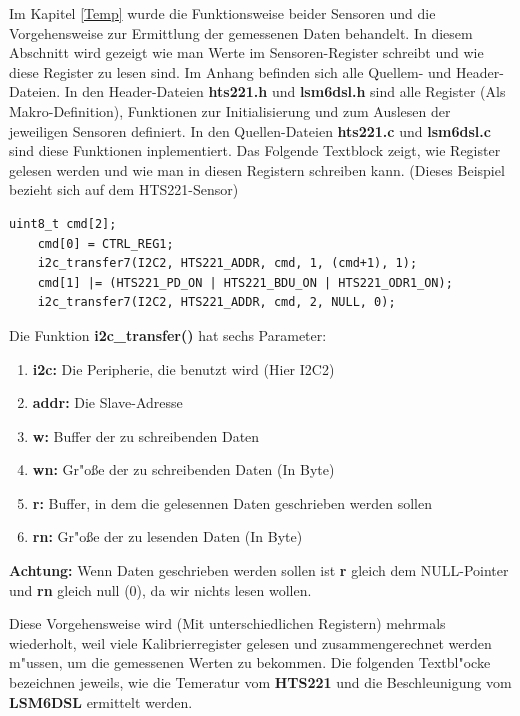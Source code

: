 \vspace{2cm}
Im Kapitel \ref{Temp} wurde die Funktionsweise beider Sensoren und die 
Vorgehensweise zur Ermittlung der gemessenen Daten behandelt. In diesem 
Abschnitt wird gezeigt wie man Werte im Sensoren-Register schreibt und
wie diese Register zu lesen sind. Im Anhang befinden sich alle Quellem- 
und Header-Dateien. In den Header-Dateien \textbf{hts221.h} und 
\textbf{lsm6dsl.h} sind alle Register (Als Makro-Definition), 
Funktionen zur Initialisierung und zum Auslesen der jeweiligen Sensoren 
definiert. In den Quellen-Dateien \textbf{hts221.c} und 
\textbf{lsm6dsl.c} sind diese Funktionen inplementiert. Das Folgende 
Textblock zeigt, wie Register gelesen werden und wie man in diesen 
Registern schreiben kann. (Dieses Beispiel bezieht sich auf dem 
HTS221-Sensor)

\begin{lstlisting}[frame=single]
	uint8_t cmd[2];
	cmd[0] = CTRL_REG1;
	i2c_transfer7(I2C2, HTS221_ADDR, cmd, 1, (cmd+1), 1);
	cmd[1] |= (HTS221_PD_ON | HTS221_BDU_ON | HTS221_ODR1_ON);
	i2c_transfer7(I2C2, HTS221_ADDR, cmd, 2, NULL, 0);

\end{lstlisting}
Die Funktion \textbf{i2c\_transfer()} hat sechs Parameter:

\begin{enumerate}
	\item \textbf{i2c:} Die Peripherie, die benutzt wird (Hier I2C2) 
	\item \textbf{addr:} Die Slave-Adresse  
	\item \textbf{w:} Buffer der zu schreibenden Daten
	\item \textbf{wn:} Gr"o\ss{}e der zu schreibenden Daten (In Byte)
	\item \textbf{r:} Buffer, in dem die gelesennen Daten geschrieben 
	werden sollen
	\item \textbf{rn:} Gr"o\ss{}e der zu lesenden Daten (In Byte)
\end{enumerate}

\textbf{Achtung:} Wenn Daten geschrieben werden sollen ist \textbf{r} 
gleich dem NULL-Pointer und \textbf{rn} gleich null (0), da wir nichts 
lesen wollen.

Diese Vorgehensweise wird (Mit unterschiedlichen Registern) mehrmals wiederholt, weil viele Kalibrierregister gelesen und zusammengerechnet werden m"ussen, um die gemessenen Werten zu bekommen. Die folgenden Textbl"ocke bezeichnen jeweils, wie die Temeratur vom \textbf{HTS221} und die Beschleunigung vom \textbf{LSM6DSL} ermittelt werden.

